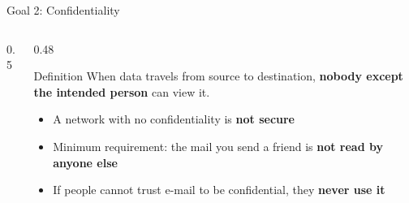 \documentclass[aspectratio=169,11pt,xcolor={table}]{beamer}
\begin{document}
\begin{frame}{Goal 2: Confidentiality}
  \begin{columns}[c]
    \begin{column}{0.5\textwidth}
      \centering
    \end{column}
    \begin{column}{0.48\textwidth}
      \begin{block}{Definition}
        \small When data travels from source to destination, \textbf{nobody except the intended person} can view it.
      \end{block}
      \begin{itemize}\small\setlength{\itemsep}{3pt}
        \item A network with no confidentiality is \textbf{not secure}
        \item Minimum requirement: the mail you send a friend is \textbf{not read by anyone else}
        \item If people cannot trust e-mail to be confidential, they \textbf{never use it}
      \end{itemize}
    \end{column}
  \end{columns}
\end{frame}
\end{document}
